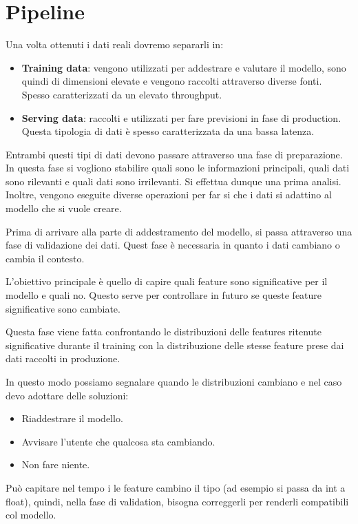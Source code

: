 \section{Pipeline}
Una volta ottenuti i dati reali dovremo separarli in:
\begin{itemize}
    \item \textbf{Training data}: vengono utilizzati per addestrare e valutare
          il modello, sono quindi di dimensioni elevate e vengono raccolti
          attraverso diverse fonti. Spesso caratterizzati da un elevato throughput.
    \item \textbf{Serving data}: raccolti e utilizzati per fare previsioni in
          fase di production. Questa tipologia di dati è spesso caratterizzata
          da una bassa latenza.
\end{itemize}
Entrambi questi tipi di dati devono passare attraverso una fase di preparazione.
In questa fase si vogliono stabilire quali sono le informazioni principali,
quali dati sono rilevanti e quali dati sono irrilevanti. Si effettua dunque una
prima analisi. Inoltre, vengono eseguite diverse operazioni per far si che i dati
si adattino al modello che si vuole creare.

Prima di arrivare alla parte di addestramento del modello, si passa attraverso una
fase di validazione dei dati. Quest fase è necessaria in quanto i dati cambiano
o cambia il contesto.

L'obiettivo principale è quello di capire quali feature sono significative
per il modello e quali no. Questo serve per controllare in futuro se queste
feature significative sono cambiate.

Questa fase viene fatta confrontando le distribuzioni delle features ritenute
significative durante il training con la distribuzione delle stesse feature prese
dai dati raccolti in produzione.

In questo modo possiamo segnalare quando le distribuzioni cambiano e nel caso devo
adottare delle soluzioni:
\begin{itemize}
    \item Riaddestrare il modello.
    \item Avvisare l'utente che qualcosa sta cambiando.
    \item Non fare niente.
\end{itemize}
Può capitare nel tempo i le feature cambino il tipo (ad esempio si passa da int
a float), quindi, nella fase di validation, bisogna correggerli per renderli
compatibili col modello.

